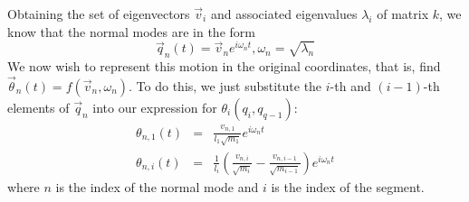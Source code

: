 \documentclass[12pt]{article}
\begin{document}
	Obtaining the set of eigenvectors $\vec{v}_i$ and associated eigenvalues $\lambda_i$ of matrix $k$, we know that the normal modes are in the form
	$$\vec{q}_n(t)=\vec{v}_n e^{i\omega_n t}, \omega_n = \sqrt{\lambda_n}$$
	We now wish to represent this motion in the original coordinates, that is, find $\vec{\theta}_n(t)=f(\vec{v}_n, \omega_n)$. To do this, we just substitute the $i$-th and $(i-1)$-th elements of $\vec{q}_n$ into our expression for $\theta_i(q_i, q_{q-1})$:
	\begin{eqnarray*}
	\theta_{n,1}(t) &=& \frac{v_{n, 1}}{l_1\sqrt{m_1}}e^{i\omega_n t}\\
	\theta_{n, i}(t)&=& \frac{1}{l_i} \left(\frac{v_{n,i}}{\sqrt{m_i}}-\frac{v_{n,i-1}}{\sqrt{m_{i-1}}}\right)e^{i\omega_n t}
	\end{eqnarray*}
	where $n$ is the index of the normal mode and $i$ is the index of the segment.
	
\end{document}
